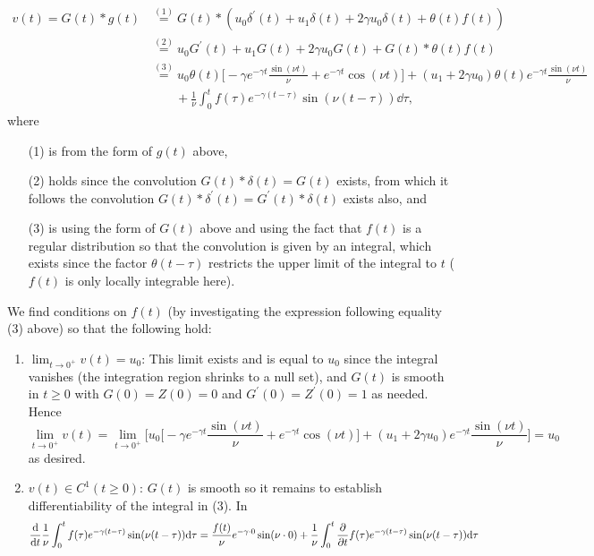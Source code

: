 \documentclass[11pt]{article}
\newcommand{\eq}[1]{\overset{(#1)}{=}}
\begin{document}
\begin{enumerate}
\begin{enumerate}[label=(\roman*)]
        \begin{align*}
            v(t) = G(t)\ast g(t) &\eq{1} G(t) \ast (u_0\delta^\prime(t) + u_1\delta(t) + 2\gamma u_0\delta(t) + \theta(t)f(t))\\
            &\eq{2} u_0G^\prime(t) + u_1G(t) + 2\gamma u_0G(t) + G(t)\ast \theta(t)f(t)\\
            &\eq{3} u_0\theta(t)\bigg[-\gamma e^{-\gamma t}\frac{\sin(\nu t)}{\nu} + e^{-\gamma t}\cos(\nu t)\bigg] + (u_1 + 2\gamma u_0)\theta(t)e^{-\gamma t}\frac{\sin(\nu t)}{\nu}\\
            &\hspace{2em} + \frac{1}{\nu}\int_0^t f(\tau)e^{-\gamma (t-\tau)}\sin(\nu(t- \tau))\dd \tau,
        \end{align*} where \begin{enumerate}
            \item[(1)] is from the form of $g(t)$ above,
            \item[(2)] holds since the convolution $G(t)\ast \delta(t) = G(t)$ exists, from which it follows the convolution $G(t)\ast \delta^\prime(t) = G^\prime(t)\ast \delta(t)$ exists also, and
            \item[(3)] is using the form of $G(t)$ above and using the fact that $f(t)$ is a regular distribution so that the convolution is given by an integral, which exists since the factor $\theta(t-\tau)$ restricts the upper limit of the integral to $t$ ($f(t)$ is only locally integrable here).
        \end{enumerate}
        We find conditions on $f(t)$ (by investigating the expression following equality (3) above) so that the following hold:
        \begin{enumerate}[label=(\alph*)]
            \item $\lim_{t\to 0^+}v(t) = u_0$: This limit exists and is equal to $u_0$ since the integral vanishes (the integration region shrinks to a null set), and $G(t)$ is smooth in $t\geq 0$ with $G(0) = Z(0) = 0$ and $G^\prime(0) = Z^\prime(0) = 1$ as needed. Hence 
            \[\lim_{t\to 0^+}v(t) = \lim_{t\to 0^+} \bigg[u_0\bigg[-\gamma e^{-\gamma t}\frac{\sin(\nu t)}{\nu} + e^{-\gamma t}\cos(\nu t)\bigg] + (u_1 + 2\gamma u_0)e^{-\gamma t}\frac{\sin(\nu t)}{\nu}\bigg] = u_0\] as desired.
            \item $v(t)\in C^1(t\geq 0)$: $G(t)$ is smooth so it remains to establish differentiability of the integral in (3). In 
            \begin{align*}
                \dv t \frac{1}{\nu}\int_0^t f(\tau)e^{-\gamma (t-\tau)}\sin(\nu(t- \tau))\dd \tau &= \frac{f(t)}{\nu}e^{-\gamma\cdot 0}\sin(\nu\cdot 0) + \frac{1}{\nu}\int_0^t \pdv tf(\tau)e^{-\gamma (t-\tau)}\sin(\nu(t- \tau))\dd \tau\\

\end{align*}
\end{enumerate}
\end{enumerate}
\end{enumerate}
\end{document}
